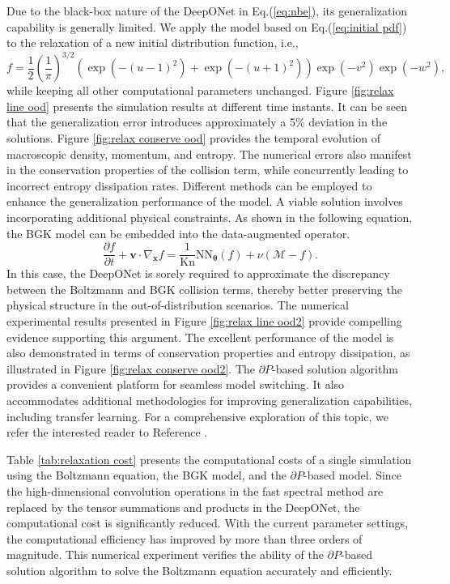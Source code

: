 \documentclass[preprint,3p,12pt,sort&compress]{elsarticle}
\begin{document}
Due to the black-box nature of the DeepONet in Eq.(\ref{eq:nbe}), its generalization capability is generally limited.
We apply the model based on Eq.(\ref{eq:initial pdf}) to the relaxation of a new initial distribution function, i.e.,
\begin{equation}
    f = \frac{1}{2}\left(\frac{1}{\pi}\right)^{3/2}(\exp(-(u-1)^2)+\exp(-(u+1)^2))\exp(-v^2)\exp(-w^2),
\end{equation}
while keeping all other computational parameters unchanged.
Figure \ref{fig:relax line ood} presents the simulation results at different time instants.
It can be seen that the generalization error introduces approximately a 5\% deviation in the solutions.
Figure \ref{fig:relax conserve ood} provides the temporal evolution of macroscopic density, momentum, and entropy.
The numerical errors also manifest in the conservation properties of the collision term, while concurrently leading to incorrect entropy dissipation rates.
Different methods can be employed to enhance the generalization performance of the model.
A viable solution involves incorporating additional physical constraints.
As shown in the following equation, the BGK model can be embedded into the data-augmented operator.
\begin{equation}
    \frac{\partial f}{\partial t} + \mathbf v \cdot \nabla_\mathbf x f = \frac{1}{\mathrm{Kn}} \mathrm{NN}_{\boldsymbol{\theta}}(f)+\nu(\mathcal M-f).
\label{eq:ube}
\end{equation}
In this case, the DeepONet is sorely required to approximate the discrepancy between the Boltzmann and BGK collision terms, thereby better preserving the physical structure in the out-of-distribution scenarios.
The numerical experimental results presented in Figure \ref{fig:relax line ood2} provide compelling evidence supporting this argument.
The excellent performance of the model is also demonstrated in terms of conservation properties and entropy dissipation, as illustrated in Figure \ref{fig:relax conserve ood2}.
The $\partial P$-based solution algorithm provides a convenient platform for seamless model switching.
It also accommodates additional methodologies for improving generalization capabilities, including transfer learning. For a comprehensive exploration of this topic, we refer the interested reader to Reference \cite{zhuang2020comprehensive}.

Table \ref{tab:relaxation cost} presents the computational costs of a single simulation using the Boltzmann equation, the BGK model, and the $\partial P$-based model.
Since the high-dimensional convolution operations in the fast spectral method are replaced by the tensor summations and products in the DeepONet, the computational cost is significantly reduced.
With the current parameter settings, the computational efficiency has improved by more than three orders of magnitude.
This numerical experiment verifies the ability of the $\partial P$-based solution algorithm to solve the Boltzmann equation accurately and efficiently.
\end{document}
